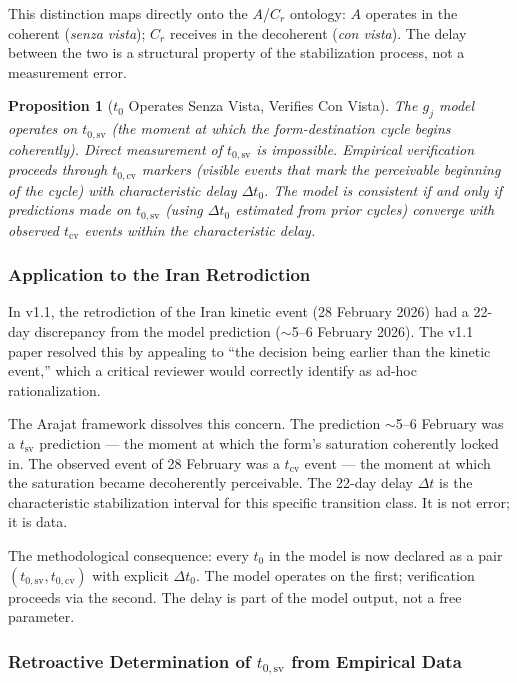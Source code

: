 \documentclass[12pt,a4paper]{article}
\newtheorem{proposition}{Proposition}[section]
\newcommand{\reag}{C_r}
\newcommand{\gj}{g_j}
\newcommand{\Mpot}{A}
\begin{document}
This distinction maps directly onto the $\Mpot$/$\reag$ ontology: $\Mpot$ operates in the coherent (\emph{senza vista}); $\reag$ receives in the decoherent (\emph{con vista}). The delay between the two is a structural property of the stabilization process, not a measurement error.

\begin{proposition}[$t_0$ Operates Senza Vista, Verifies Con Vista]\label{prop:t0_arajat}
The $\gj$ model operates on $t_{0,\mathrm{sv}}$ (the moment at which the form-destination cycle begins coherently). Direct measurement of $t_{0,\mathrm{sv}}$ is impossible. Empirical verification proceeds through $t_{0,\mathrm{cv}}$ markers (visible events that mark the perceivable beginning of the cycle) with characteristic delay $\Delta t_0$. The model is consistent if and only if predictions made on $t_{0,\mathrm{sv}}$ (using $\Delta t_0$ estimated from prior cycles) converge with observed $t_{\mathrm{cv}}$ events within the characteristic delay.
\end{proposition}

\subsubsection{Application to the Iran Retrodiction}

In v1.1, the retrodiction of the Iran kinetic event (28 February 2026) had a 22-day discrepancy from the model prediction ($\sim$5--6 February 2026). The v1.1 paper resolved this by appealing to ``the decision being earlier than the kinetic event,'' which a critical reviewer would correctly identify as ad-hoc rationalization.

The Arajat framework dissolves this concern. The prediction $\sim$5--6 February was a $t_{\mathrm{sv}}$ prediction --- the moment at which the form's saturation coherently locked in. The observed event of 28 February was a $t_{\mathrm{cv}}$ event --- the moment at which the saturation became decoherently perceivable. The 22-day delay $\Delta t$ is the characteristic stabilization interval for this specific transition class. It is not error; it is data.

The methodological consequence: every $t_0$ in the model is now declared as a pair $(t_{0,\mathrm{sv}}, t_{0,\mathrm{cv}})$ with explicit $\Delta t_0$. The model operates on the first; verification proceeds via the second. The delay is part of the model output, not a free parameter.

\subsubsection{Retroactive Determination of $t_{0,\mathrm{sv}}$ from Empirical Data}\label{subsubsec:t0_retro}
\end{document}
